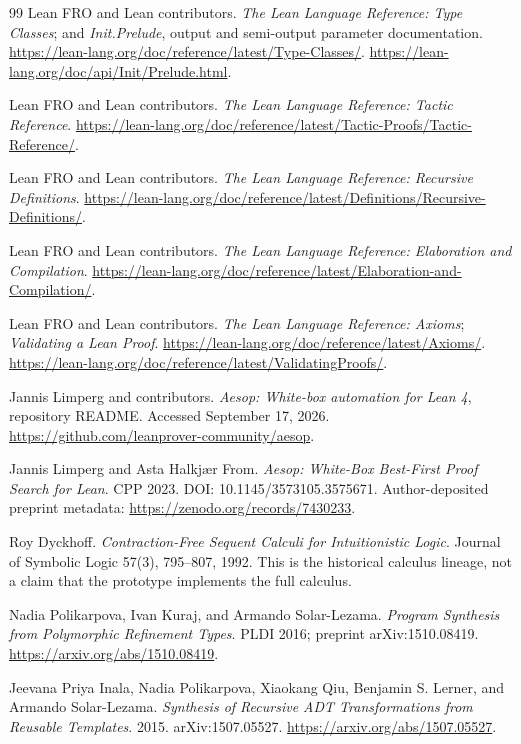 \begin{thebibliography}{99}
Lean FRO and Lean contributors. \emph{The Lean Language Reference: Type Classes}; and \emph{Init.Prelude}, output and semi-output parameter documentation.
\url{https://lean-lang.org/doc/reference/latest/Type-Classes/}.
\url{https://lean-lang.org/doc/api/Init/Prelude.html}.

Lean FRO and Lean contributors. \emph{The Lean Language Reference: Tactic Reference}.
\url{https://lean-lang.org/doc/reference/latest/Tactic-Proofs/Tactic-Reference/}.

Lean FRO and Lean contributors. \emph{The Lean Language Reference: Recursive Definitions}.
\url{https://lean-lang.org/doc/reference/latest/Definitions/Recursive-Definitions/}.

Lean FRO and Lean contributors. \emph{The Lean Language Reference: Elaboration and Compilation}.
\url{https://lean-lang.org/doc/reference/latest/Elaboration-and-Compilation/}.

Lean FRO and Lean contributors. \emph{The Lean Language Reference: Axioms}; \emph{Validating a Lean Proof}.
\url{https://lean-lang.org/doc/reference/latest/Axioms/}.
\url{https://lean-lang.org/doc/reference/latest/ValidatingProofs/}.

Jannis Limperg and contributors. \emph{Aesop: White-box automation for Lean 4}, repository README. Accessed September 17, 2026.
\url{https://github.com/leanprover-community/aesop}.

Jannis Limperg and Asta Halkj\ae r From. \emph{Aesop: White-Box Best-First Proof Search for Lean}. CPP 2023. DOI: 10.1145/3573105.3575671. Author-deposited preprint metadata:
\url{https://zenodo.org/records/7430233}.

Roy Dyckhoff. \emph{Contraction-Free Sequent Calculi for Intuitionistic Logic}.
Journal of Symbolic Logic 57(3), 795--807, 1992.
This is the historical calculus lineage, not a claim that the prototype implements the full calculus.

Nadia Polikarpova, Ivan Kuraj, and Armando Solar-Lezama.
\emph{Program Synthesis from Polymorphic Refinement Types}. PLDI 2016; preprint arXiv:1510.08419.
\url{https://arxiv.org/abs/1510.08419}.

Jeevana Priya Inala, Nadia Polikarpova, Xiaokang Qiu, Benjamin S. Lerner, and Armando Solar-Lezama.
\emph{Synthesis of Recursive ADT Transformations from Reusable Templates}. 2015. arXiv:1507.05527.
\url{https://arxiv.org/abs/1507.05527}.


\end{thebibliography}
